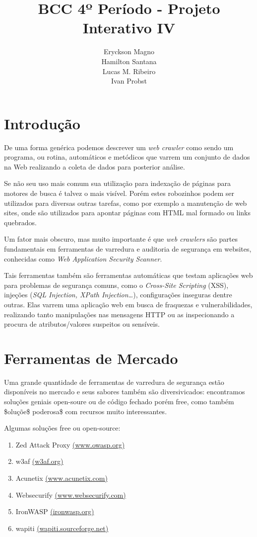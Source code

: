 \documentclass[a4paper]{article}
\title{BCC 4º Período - Projeto Interativo IV}
\author{Eryckson Magno\\
	Hamilton Santana\\
    Lucas M. Ribeiro\\
    Ivan Probst}
\begin{document}
\maketitle

\section{Introdução}

De uma forma genérica podemos descrever um \emph{web crawler} como sendo um programa, ou rotina, automáticos e metódicos que varrem um conjunto de dados na Web realizando a coleta de dados para posterior análise.

Se não seu uso mais comum sua utilização para indexação de páginas para motores de busca é talvez o mais visível. Porém estes robozinhos podem ser utilizados para diversas outras tarefas, como por exemplo a manutenção de web sites, onde são utilizados para apontar páginas com HTML mal formado ou links quebrados.

Um fator mais obscuro, mas muito importante é que \emph{web crawlers} são partes fundamentais em ferramentas de varredura e auditoria de segurança em websites, conhecidas como \emph{Web Application Security Scanner}.

Tais ferramentas também são ferramentas automáticas que testam aplicações web para problemas de segurança comuns, como o \emph{Cross-Site Scripting} (XSS), injeções (\emph{SQL Injection, XPath Injection\dots}), configurações inseguras dentre outras. Elas varrem uma aplicação web em busca de fraquezas e vulnerabilidades, realizando tanto manipulações nas mensagens HTTP ou as inspecionando a procura de atributos/valores suspeitos ou sensíveis.

\section{Ferramentas de Mercado}

Uma grande quantidade de ferramentas de varredura de segurança estão disponíveis no mercado e seus sabores também são diversivicados: encontramos soluções geniais open-soure ou de código fechado porém free, como também \$oluçõe\$ poderosa\$ com recursos muito interessantes.

Algumas soluções free ou open-source:

\begin{enumerate}
\item Zed Attack Proxy \href{https://www.owasp.org/index.php/OWASP_Zed_Attack_Proxy_Project}{(www.owasp.org)}
\item w3af \href{http://w3af.org/}{(w3af.org)}
\item Acunetix \href{http://www.acunetix.com/}{(www.acunetix.com)}
\item Websecurify \href{http://www.websecurify.com/}{(www.websecurify.com)}
\item IronWASP \href{http://ironwasp.org/}{(ironwasp.org)}
\item wapiti \href{http://wapiti.sourceforge.net/}{(wapiti.sourceforge.net)}
\end{enumerate}
\end{document}

